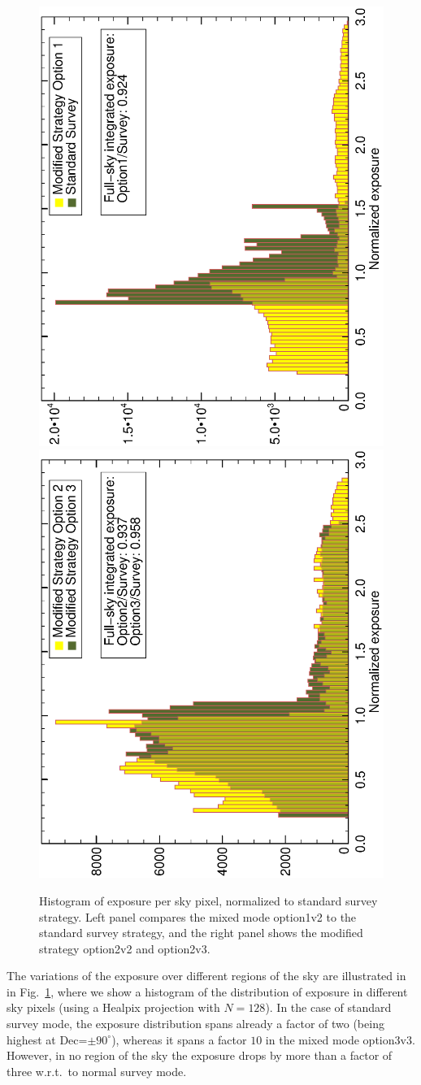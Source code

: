 \documentclass[aps,prd,superscriptaddress,nofootinbib,fixlfloat, 12pt]{revtex4-1}
\begin{document}
\begin{figure}[t]
  \begin{center}
    \includegraphics[width=0.39\linewidth, angle=-90]{plots/option1_survey_hist.ps}
    \includegraphics[width=0.39\linewidth, angle=-90]{plots/option2_option3_hist.ps}
    \vspace{-0.5cm}
  \end{center}
  \caption{Histogram of exposure per sky pixel, normalized to standard survey
    strategy. Left panel compares the
    mixed mode option1v2 to the standard survey strategy, and the right panel
    shows the modified strategy option2v2 and option2v3.}
  \label{fig:expHisto}
\end{figure}

The variations of the exposure over different regions of the sky are
illustrated in in Fig.~\ref{fig:expHisto}, where we show a histogram of the
distribution of exposure in different sky pixels (using a Healpix projection
with $N=128$). In the case of standard survey mode, the exposure distribution
spans already a factor of two (being highest at Dec=$\pm90^\circ$), whereas it
spans a factor $10$ in the mixed mode option3v3. However, in no region of the
sky the exposure drops by more than a factor of three w.r.t.~to normal survey
mode.
\end{document}
